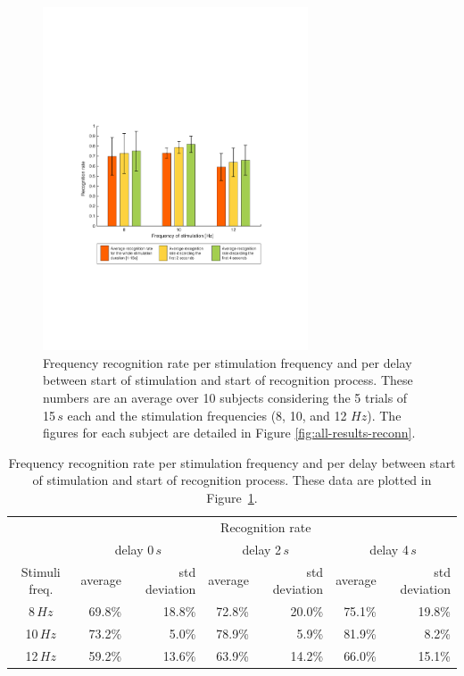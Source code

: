 \documentclass[smallextended]{svjour3}
\begin{document}
\begin{figure}
\center
\includegraphics[width=0.7\textwidth]{figures/taux-reconn.pdf}
\caption{Frequency recognition rate per stimulation frequency and per delay between start of stimulation and start of recognition process. These numbers are an average over 10 subjects considering the 5 trials of 15\,$s$ each and the stimulation frequencies (8, 10, and 12 $Hz$). The figures for each subject are detailed in Figure \ref{fig:all-results-reconn}.}
\label{fig:taux-reconn}
\end{figure}

\begin{table}\begin{center}
    \begin{tabular}{ c | r | r | r | r | r | r |}
        & \multicolumn{6}{c|}{Recognition rate} \\ 
        & \multicolumn{2}{c|}{delay 0\,$s$} & \multicolumn{2}{c|}{delay 2\,$s$} & \multicolumn{2}{c|}{delay 4\,$s$} \\ 
        Stimuli freq.& average & std deviation & average & std deviation & average & std deviation \\ \hline

         8\,$Hz$ & 69.8\% & 18.8\% & 72.8\% & 20.0\% & 75.1\% & 19.8\% \\
        10\,$Hz$ & 73.2\% &  5.0\% & 78.9\% & 5.9\% & 81.9\% & 8.2\% \\
        12\,$Hz$ & 59.2\% & 13.6\% & 63.9\% & 14.2\% & 66.0\% & 15.1\% \\ \hline
    \end{tabular}
    \caption{Frequency recognition rate per stimulation frequency and per delay between start of stimulation and start of recognition process. These data are plotted in Figure~\ref{fig:taux-reconn}.}
\end{center}\end{table}
\end{document}
